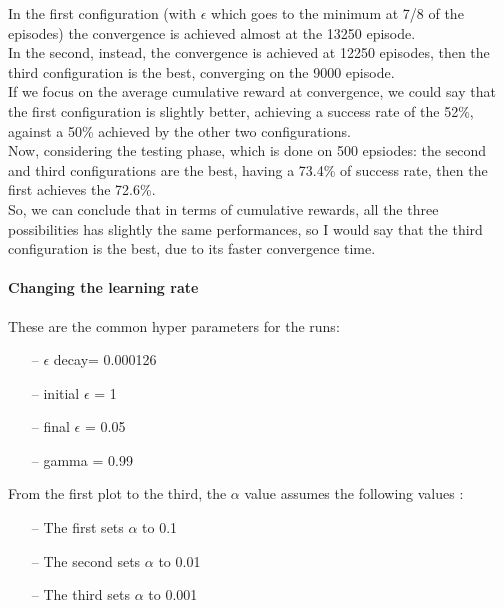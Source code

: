 \documentclass{article}
\begin{document}
In the first configuration (with $\epsilon$ which goes to the minimum at 7/8 of the episodes) the convergence is achieved almost at the 13250 episode.
\\
In the second, instead, the convergence is achieved at 12250 episodes, then the third configuration is the best, converging on the 9000 episode.
\\
If we focus on the average cumulative reward at convergence, we could say that the first configuration is slightly better, achieving a success rate of the 52\%, against a 50\% achieved by the other two configurations.
\\
Now, considering the testing phase, which is done on 500 epsiodes: the second and third configurations are the best, having a 73.4\% of success rate, then the first achieves the 72.6\%.
\\
So, we can conclude that in terms of cumulative rewards, all the three possibilities has slightly the same performances, so I would say that the third configuration is the best, due to its faster convergence time.


\paragraph{Changing the learning rate}


These are the common hyper parameters for the runs:
\begin{itemize}
\item[--] $\epsilon$ decay= 0.000126
\item[--] initial $\epsilon$ = 1
\item[--] final $\epsilon$ = 0.05
\item[--] gamma = 0.99
\end{itemize}

From the first plot to the third, the $\alpha$ value assumes the following values :
\begin{itemize}
\item[--] The first sets $\alpha$ to 0.1
\item[--] The second sets $\alpha$ to 0.01
\item[--] The third sets $\alpha$ to 0.001
\end{itemize}

\clearpage


\begin{center}
\centering
{}
\end{center}
\end{document}
